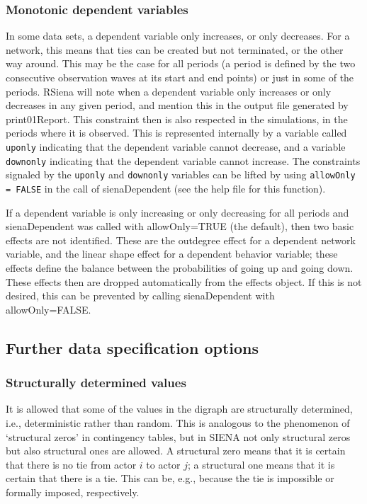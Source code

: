 \documentclass[a4paper,fleqn,11pt]{article}
\newcommand{\+}{\, + \,}
\newcommand{\sfn}[1]{\textsf{#1}}
\newcommand{\RS}{{\sf RSiena }}
\newcommand{\SI}{{\sf SIENA }}
\begin{document}
\subsubsection{Monotonic dependent variables}
\label{S_monotone}


In some data sets, a dependent variable only increases, or only decreases.
For a network, this means that ties can be created but not terminated,
or the other way around.
This may be the case for all periods (a period is defined by the
two consecutive observation waves at its start and end points)
or just in some of the periods.
\RS will note when a dependent variable only increases or only decreases
in any given period,
and mention this in the output file generated by \textsf{print01Report}.
This constraint then is also respected in the simulations, in the periods
where it is observed.
This is represented
internally by a variable called \texttt{uponly} indicating that the
dependent variable cannot decrease,
and a variable \texttt{downonly} indicating that the
dependent variable cannot increase.
The constraints signaled by the  \texttt{uponly} and  \texttt{downonly}
variables can be lifted by using \texttt{allowOnly = FALSE}
in the call of \sfn{sienaDependent} (see the help file for this function).

If a dependent variable is only increasing or only decreasing
for all periods and \sfn{sienaDependent} was called with
\sfn{allowOnly=TRUE} (the default),
then two basic effects are not identified.
These are the outdegree effect for a dependent network variable,
and the linear shape effect for a dependent behavior variable;
these effects define the balance between the probabilities of
going up and going down.
These effects then are dropped automatically from the effects object.
If this is not desired, this can be prevented
by calling \sfn{sienaDependent} with \sfn{allowOnly=FALSE}.


\subsection{Further data specification options}
\label{S_usertrans}

\subsubsection{Structurally determined values}
\label{S_struct}

It is allowed that some of the values in the digraph are
structurally determined, i.e., deterministic rather than random.
This is analogous to the phenomenon of `structural zeros' in
contingency tables, but in \SI not only structural zeros but also
structural ones are allowed. A structural zero means that it is
certain that there is no tie from actor $i$ to actor $j$; a
structural one means that it is certain that there is a tie. This
can be, e.g., because the tie is impossible or formally imposed,
respectively.
\end{document}
